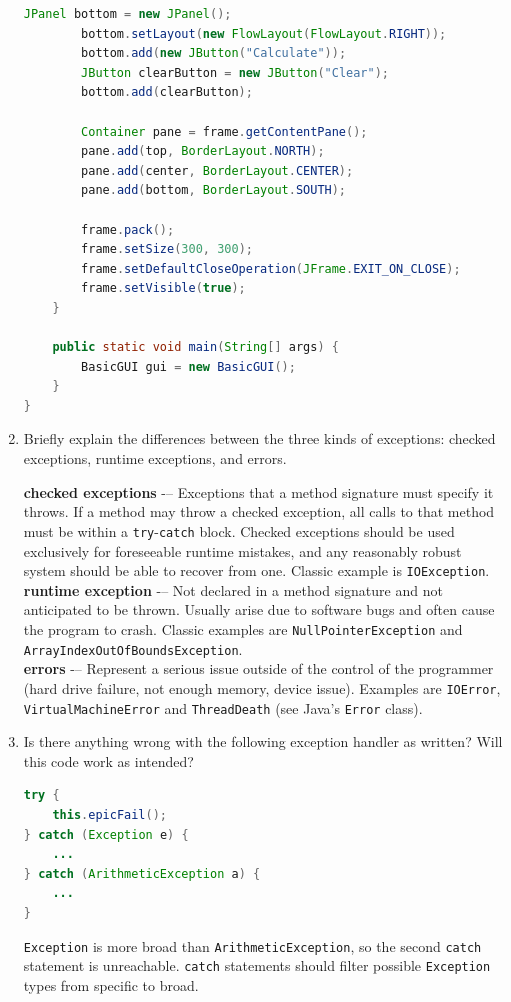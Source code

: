 \documentclass[11pt]{article}
\newenvironment{answer}{\large\lstset{basicstyle=\tiny\ttfamily}\color{white} }{}
\newenvironment{answer}{\large\lstset{basicstyle=\large\ttfamily}\color{red} }{}
\begin{document}
\begin{enumerate}
\begin{answer}
\begin{lstlisting}[language=java,basicstyle=\small]
		JPanel bottom = new JPanel();
		bottom.setLayout(new FlowLayout(FlowLayout.RIGHT));
		bottom.add(new JButton("Calculate"));
		JButton clearButton = new JButton("Clear");
		bottom.add(clearButton);
		
		Container pane = frame.getContentPane();
		pane.add(top, BorderLayout.NORTH);
		pane.add(center, BorderLayout.CENTER);
		pane.add(bottom, BorderLayout.SOUTH);
		
		frame.pack();
		frame.setSize(300, 300);
		frame.setDefaultCloseOperation(JFrame.EXIT_ON_CLOSE);
		frame.setVisible(true);
	}
	
	public static void main(String[] args) {
		BasicGUI gui = new BasicGUI();
	}
}
\end{lstlisting}
\end{answer}


\newpage
\item Briefly explain the differences between the three kinds of exceptions: checked exceptions, runtime exceptions, and errors.
\begin{answer}

\textbf{checked exceptions} -– Exceptions that a method signature must specify it throws. If a method
may throw a checked exception, all calls to that method must be within a \texttt{try}-\texttt{catch} block. Checked exceptions should be used exclusively for foreseeable runtime mistakes, and any reasonably robust
system should be able to recover from one. Classic example is \texttt{IOException}.\\

\textbf{runtime exception} -– Not declared in a method signature and not anticipated to be thrown.
Usually arise due to software bugs and often cause the program to crash. Classic
examples are \texttt{NullPointerException} and \texttt{ArrayIndexOutOfBoundsException}.\\

\textbf{errors} -– Represent a serious issue outside of the control of the programmer (hard drive
failure, not enough memory, device issue). Examples are \texttt{IOError}, \texttt{VirtualMachineError} and
\texttt{ThreadDeath} (see Java's \texttt{Error} class).
\end{answer}


\vspace{48pt}
\item Is there anything wrong with the following exception handler as written? Will this
code work as intended? 
\begin{lstlisting}[language=java]
try {
	this.epicFail();
} catch (Exception e) {
	...
} catch (ArithmeticException a) {
	...
}
\end{lstlisting}
\begin{answer}
\texttt{Exception} is more broad than \texttt{ArithmeticException}, so the second \texttt{catch} statement is unreachable.  \texttt{catch} statements should filter possible \texttt{Exception} types from specific to broad.
\end{answer}
\newpage




\end{enumerate}
\end{document}
